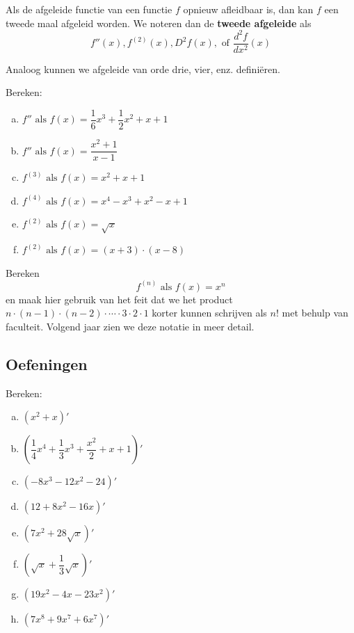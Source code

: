 \documentclass[12pt]{article}
\begin{document}
Als de afgeleide functie van een functie $f$ opnieuw afleidbaar is, dan kan $f$ een tweede maal afgeleid worden. We noteren dan de {\bf tweede afgeleide} als
$$f''(x), f^{(2)}(x), D^2f(x), \mbox{ of } \dfrac{d^2f}{dx^2}(x)$$

Analoog kunnen we afgeleide van orde drie, vier, enz. definiëren.

\begin{oefening}
  Bereken:
  \begin{multicols}{2}
  \begin{enumerate}[(a)]
  \itemsep1em
  \item $f'' \mbox{ als } f(x)=\dfrac{1}{6}x^3+\dfrac{1}{2}x^2+x+1$
  \item $f'' \mbox{ als } f(x)=\dfrac{x^2+1}{x-1}$
  \item $f^{(3)} \mbox{ als } f(x)=x^2+x+1$
  \item $f^{(4)} \mbox{ als } f(x)=x^4-x^3+x^2-x+1$
  \item $f^{(2)} \mbox{ als } f(x)=\sqrt{x}$
  \item $f^{(2)} \mbox{ als } f(x)=(x+3)\cdot(x-8)$
  \end{enumerate}
  \end{multicols}
\end{oefening}

\begin{oefening}
Bereken
$$f^{(n)} \mbox{ als } f(x)=x^n$$
en maak hier gebruik van het feit dat we het product $n\cdot(n-1)\cdot(n-2)\cdot \cdots \cdot 3\cdot 2\cdot 1$ korter kunnen schrijven als $n!$ met behulp van faculteit. Volgend jaar zien we deze notatie in meer detail.
\end{oefening}

\pagebreak
\subsection{Oefeningen}

\begin{oefening}
  Bereken:
  \begin{multicols}{2}
  \begin{enumerate}[(a)]
  \itemsep1em
  \item $\displaystyle\left( x^2+x \right)'$
  \item $\displaystyle\left( \dfrac{1}{4}x^4+\dfrac{1}{3}x^3+\dfrac{x^2}{2}+x+1 \right)'$
  \item $\displaystyle\left( -8x^3-12x^2-24 \right)'$
  \item $\displaystyle\left( 12+8x^2-16x \right)'$
  \item $\displaystyle\left( 7x^2+28\sqrt{x} \right)'$
  \item $\displaystyle\left( \sqrt{x}+\dfrac{1}{3}\sqrt{x} \right)'$
  \item $\displaystyle\left( 19x^2-4x-23x^2 \right)'$
  \item $\displaystyle\left( 7x^8+9x^7+6x^7 \right)'$
  \end{enumerate}
  \end{multicols}
\end{oefening}
\end{document}

